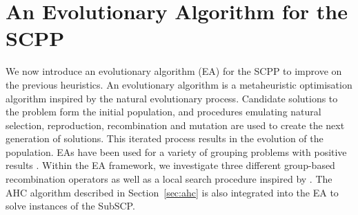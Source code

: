 \documentclass[authoryear]{elsarticle}
\begin{document}
\begin{comment}
It can be seen that MFFD$^+$ produces solutions using fewer bins on average than MFFD for all 12 instance classes. MFFD was only able to find solutions using $t$ bins for two instance classes, whereas MFFD$^+$ produced solutions using $t$ bins for four instances classes. Solutions using fewer bins were found less frequently on average when the bin size is larger. A larger bin size means the bins can accommodate more items, however this increases the number of adjacent score widths that must fulfil the vicinal sum constraint. 


Indeed, it may be that optimal solutions were found in many of these instances, as the lower bound for $k$ may actually be higher than the theoretical minimum calculated. These experiments provide clear results that the use of an exact polynomial-time algorithm, AHC, within a heuristic is more powerful than using a simple heuristic alone. In spite of this, MFFD$^+$ lacks the capability of rearranging items \emph{between} bins, that is, once an item has been packed into a bin, it must stay in that bin (although the position of the item in the bin can change due to the use of AHC). It follows that every item packed has an effect on where the unplaced items can be placed, i.e. where an item is packed is dependent on where previous items have been packed. These limitations associated with greedy heuristics lead us to explore other superior methods.
\end{comment}


\section{An Evolutionary Algorithm for the SCPP}
\label{sec:ea}
\noindent We now introduce an evolutionary algorithm (EA) for the SCPP to improve on the previous heuristics. An evolutionary algorithm is a metaheuristic optimisation algorithm inspired by the natural evolutionary process. Candidate solutions to the problem form the initial population, and procedures emulating natural selection, reproduction, recombination and mutation are used to create the next generation of solutions. This iterated process results in the evolution of the population. EAs have been used for a variety of grouping problems with positive results \citep{lewis2017, falkenauer1996, quiroz2015}. Within the EA framework, we investigate three different group-based recombination operators as well as a local search procedure inspired by \citet{martello1990l}. The AHC algorithm described in Section~\ref{sec:ahc} is also integrated into the EA to solve instances of the SubSCP.
\end{document}
